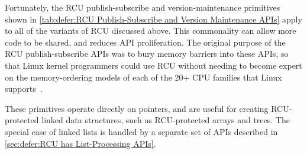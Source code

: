 Fortunately, the RCU publish-subscribe and version-maintenance
primitives shown in
\cref{tab:defer:RCU Publish-Subscribe and Version Maintenance APIs}
apply to all of the variants of RCU discussed above.
This commonality can allow more code to be shared, and reduces API
proliferation.
The original purpose of the RCU publish-subscribe APIs was to
bury memory barriers into these APIs, so that Linux kernel
programmers could use RCU without needing to become expert on
the memory-ordering models of each of the 20+ CPU families
that Linux supports~\cite{Spraul01}.

\begin{table}
\renewcommand*{\arraystretch}{1.15}
\footnotesize
\centering\OneColumnHSpace{-.4in}
\caption{RCU Publish-Subscribe and Version Maintenance APIs}
\label{tab:defer:RCU Publish-Subscribe and Version Maintenance APIs}
\end{table}

These primitives operate directly on pointers, and are useful for
creating RCU-protected linked data structures, such as RCU-protected
arrays and trees.
The special case of linked lists is handled by a separate set of
APIs described in
\cref{sec:defer:RCU has List-Processing APIs}.

